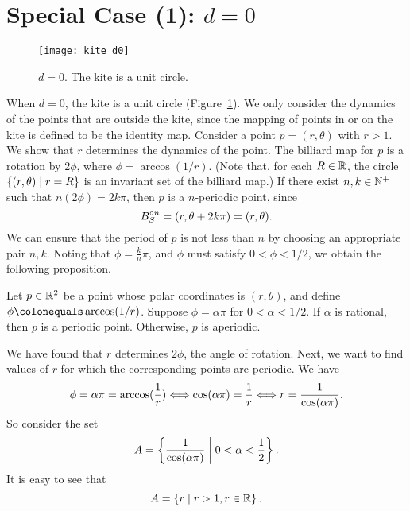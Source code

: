 \documentclass[12pt,twoside,draft]{book}
\begin{document}
\section{Special Case (1): $d = 0$}
\begin{figure}[ht]
  \begin{center}
    \texttt{[image: kite\_d0]}
    \caption{$d = 0$. The kite is a unit circle.}
    \label{fig:kite-circle}
  \end{center}
\end{figure}
When $d = 0$, the kite is a unit circle (Figure~\ref{fig:kite-circle}).
We only consider the dynamics of the points that are outside the kite, since the mapping of points in or on the kite is defined to be the identity map.
Consider a point $p = (r, \theta)$ with $r > 1$.
We show that $r$ determines the dynamics of the point.
The billiard map for $p$ is a rotation by $2\phi$, where $\phi = \arccos(1/r)$.
(Note that, for each $R \in \mathbb{R}$, the circle $\left \{ (r,\theta) \mathrel{} \middle| \mathrel{} r = R \right \}$ is an invariant set of the billiard map.)
If there exist $n, k \in \mathbb{N}^+$ such that $n(2\phi) = 2k\pi$, then $p$ is a $n$-periodic point, since 
\begin{equation*}
  B_S^{\circ n} = (r, \theta + 2k\pi) = (r, \theta).
\end{equation*}
We can ensure that the period of $p$ is not less than $n$ by choosing an appropriate pair $n,k$.
Noting that $\phi = \frac{k}{n}\pi$, and $\phi$ must satisfy $0 < \phi < 1/2$, we obtain the following proposition.
\begin{proposition}
  Let $p \in \mathbb{R}^2$ be a point whose polar coordinates is $(r,\theta)$, and define $\phi \ceq \arccos(1/r)$.
  Suppose $\phi = \alpha\pi$ for $0 < \alpha < 1/2$.
  If $\alpha$ is rational, then $p$ is a periodic point.
  Otherwise, $p$ is aperiodic.
\end{proposition}
We have found that $r$ determines $2\phi$, the angle of rotation.
Next, we want to find values of $r$ for which the corresponding points are periodic.
We have
\begin{equation*}
  \phi = \alpha\pi = \arccos(\frac{1}{r}) 
  \Longleftrightarrow \cos(\alpha\pi) = \frac{1}{r}
  \Longleftrightarrow r = \frac{1}{\cos(\alpha\pi)}.
\end{equation*}
So consider the set
\begin{equation*}
  A = \left \{ \frac{1}{\cos(\alpha\pi)} \mathrel{} \middle| \mathrel{} 0 < \alpha < \frac{1}{2} \right \}.
\end{equation*}
It is easy to see that
\begin{equation*}
  A = \left \{ r \mathrel{} \middle| \mathrel{} r > 1, r \in \mathbb{R} \right \}.
\end{equation*}
\end{document}
